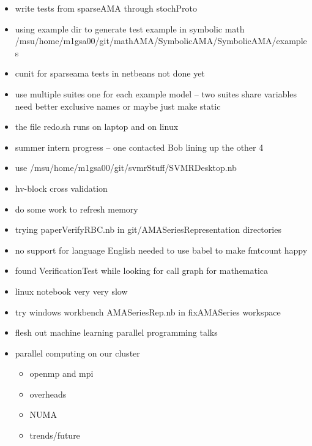 \documentclass[hyperref]{labbook}
\begin{document}

\begin{itemize}
\item write tests  from sparseAMA through stochProto
\item using example dir to generate test example in symbolic math
/msu/home/m1gsa00/git/mathAMA/SymbolicAMA/SymbolicAMA/examples
\item cunit for sparseama tests in netbeans not done yet
\item use multiple suites one for each example model  -- two suites share variables need better exclusive names or maybe just make static
\item the file redo.sh runs on laptop and on linux
\end{itemize}

\begin{itemize}
\item summer intern progress -- one contacted Bob lining up the other 4
\item use /msu/home/m1gsa00/git/svmrStuff/SVMRDesktop.nb 
\item hv-block cross validation
\end{itemize}

\begin{itemize}
\item do some work to refresh memory 
\item trying paperVerifyRBC.nb in git/AMASeriesRepresentation directories
\item no support for language English  needed to use babel to make fmtcount happy
\item found VerificationTest while looking for call graph for mathematica
\item linux notebook very very slow
\item try windows workbench  AMASeriesRep.nb in fixAMASeries workspace
\end{itemize}


\begin{itemize}
\item flesh out machine learning parallel programming talks
\item parallel computing on our cluster
  \begin{itemize}
  \item openmp and mpi
  \item overheads
  \item NUMA
  \item trends/future
  \end{itemize}
\end{itemize}
\end{document}
